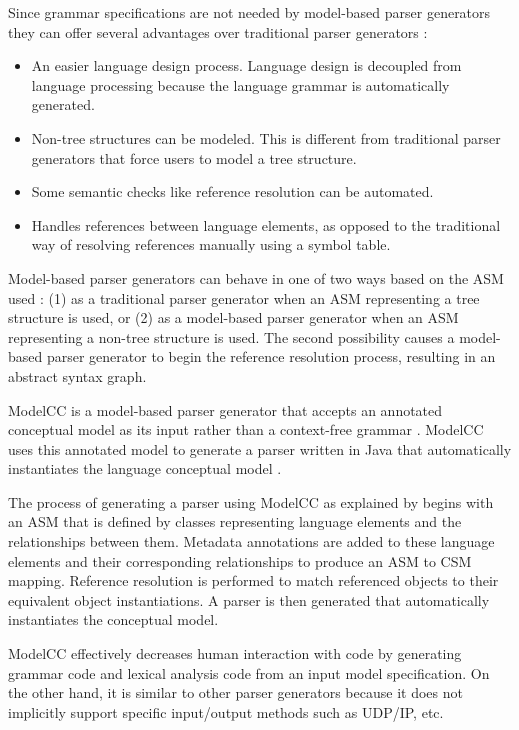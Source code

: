 \indent
Since grammar specifications are not needed by model-based parser generators they can offer several advantages over traditional parser generators \cite{quesada_02}:
\begin{itemize}
  \item An easier language design process.  Language design is decoupled from language processing because the language grammar is automatically generated.
  \item Non-tree structures can be modeled.  This is different from traditional parser generators that force users to model a tree structure.
  \item Some semantic checks like reference resolution can be automated.
  \item Handles references between language elements, as opposed to the traditional way of resolving references manually using a symbol table.
\end{itemize}

\indent
Model-based parser generators can behave in one of two ways based on the ASM used \cite{quesada_02}: (1) as a traditional parser generator when an ASM representing a tree structure is used, or (2) as a model-based parser generator when an ASM representing a non-tree structure is used.   The second possibility causes a model-based parser generator to begin the reference resolution process, resulting in an abstract syntax graph.

\indent
ModelCC is a model-based parser generator that accepts an annotated conceptual model as its input rather than a context-free grammar \cite{quesada_01}.  ModelCC uses this annotated model to generate a parser written in Java that automatically instantiates the language conceptual model \cite{quesada_01, modelcc_01}.

\indent
The process of generating a parser using ModelCC as explained by \cite{quesada_02} begins with an ASM that is defined by classes representing language elements and the relationships between them.  Metadata annotations are added to these language elements and their corresponding relationships to produce an ASM to CSM mapping.  Reference resolution is performed to match referenced objects to their equivalent object instantiations.  A parser is then generated that automatically instantiates the conceptual model.

\indent
ModelCC effectively decreases human interaction with code by generating grammar code and lexical analysis code from an input model specification.  On the other hand, it is similar to other parser generators because it does not implicitly support specific input/output methods such as UDP/IP, etc.


